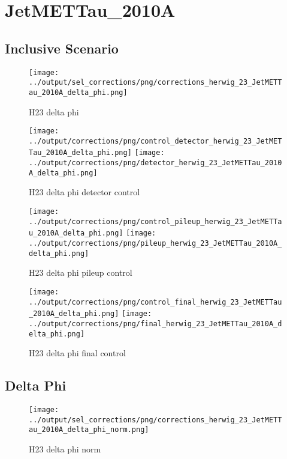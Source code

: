 \documentclass[11pt]{book}
\begin{document}
\clearpage

\section{JetMETTau\_2010A}

\subsection{Inclusive Scenario}
\begin{figure}[ht]
\centering
\texttt{[image: ../output/sel\_corrections/png/corrections\_herwig\_23\_JetMETTau\_2010A\_delta\_phi.png]}
\caption{H23 delta phi}
\label{fig:H23_JetMETTau_2010A_delta_phi}
\end{figure}

\begin{figure}[ht]
\centering
\texttt{[image: ../output/corrections/png/control\_detector\_herwig\_23\_JetMETTau\_2010A\_delta\_phi.png]}
\texttt{[image: ../output/corrections/png/detector\_herwig\_23\_JetMETTau\_2010A\_delta\_phi.png]}
\caption{H23 delta phi detector control}
\label{fig:H23_JetMETTau_2010A_delta_phi_detector_control}
\end{figure}

\begin{figure}[ht]
\centering
\texttt{[image: ../output/corrections/png/control\_pileup\_herwig\_23\_JetMETTau\_2010A\_delta\_phi.png]}
\texttt{[image: ../output/corrections/png/pileup\_herwig\_23\_JetMETTau\_2010A\_delta\_phi.png]}
\caption{H23 delta phi pileup control}
\label{fig:H23_JetMETTau_2010A_delta_phi_pileup_control}
\end{figure}


\begin{figure}[ht]
\centering
\texttt{[image: ../output/corrections/png/control\_final\_herwig\_23\_JetMETTau\_2010A\_delta\_phi.png]}
\texttt{[image: ../output/corrections/png/final\_herwig\_23\_JetMETTau\_2010A\_delta\_phi.png]}
\caption{H23 delta phi final control}
\label{fig:H23_JetMETTau_2010A_delta_phi_final_control}
\end{figure}

\subsection{Delta Phi}
\begin{figure}[ht]
\centering
\texttt{[image: ../output/sel\_corrections/png/corrections\_herwig\_23\_JetMETTau\_2010A\_delta\_phi\_norm.png]}
\caption{H23 delta phi norm}
\label{fig:H23_JetMETTau_2010A_delta_phi_norm}
\end{figure}
\end{document}
